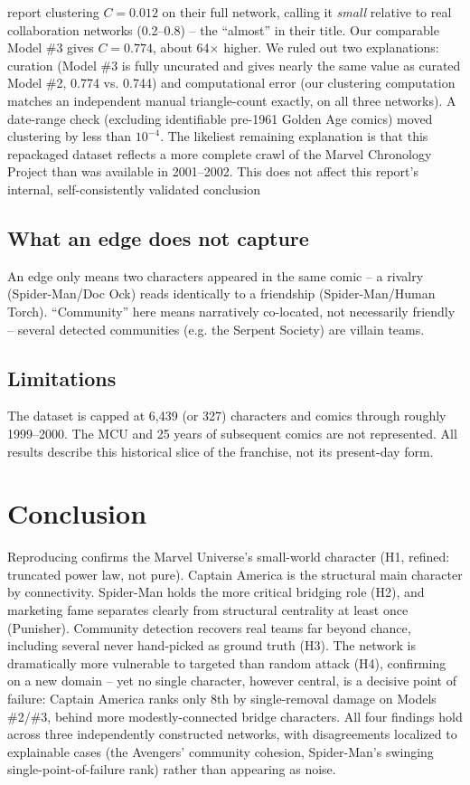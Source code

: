 \documentclass[11pt]{article}
\begin{document}
\citet{alberich2002marvel} report clustering $C = 0.012$ on their full network, calling it \emph{small} relative to real collaboration networks (0.2--0.8) -- the ``almost'' in their title. Our comparable Model \#3 gives $C = 0.774$, about 64$\times$ higher. We ruled out two explanations: curation (Model \#3 is fully uncurated and gives nearly the same value as curated Model \#2, 0.774 vs. 0.744) and computational error (our clustering computation matches an independent manual triangle-count exactly, on all three networks). A date-range check (excluding identifiable pre-1961 Golden Age comics) moved clustering by less than $10^{-4}$. The likeliest remaining explanation is that this repackaged dataset reflects a more complete crawl of the Marvel Chronology Project than was available in 2001--2002. This does not affect this report’s internal,
self-consistently validated conclusion

\subsection{What an edge does not capture}

An edge only means two characters appeared in the same comic -- a rivalry (Spider-Man/Doc Ock) reads identically to a friendship (Spider-Man/Human Torch). ``Community'' here means narratively co-located, not necessarily friendly -- several detected communities (e.g. the Serpent Society) are villain teams.

\subsection{Limitations}

The dataset is capped at 6{,}439 (or 327) characters and comics through roughly 1999--2000. The MCU and 25 years of subsequent comics are not represented. All results describe this historical slice of the franchise, not its present-day form.

\section{Conclusion}

Reproducing \citet{alberich2002marvel} confirms the Marvel Universe's small-world character (H1, refined: truncated power law, not pure). Captain America is the structural main character by connectivity. Spider-Man holds the more critical bridging role (H2), and marketing fame separates clearly from structural centrality at least once (Punisher). Community detection recovers real teams far beyond chance, including several never hand-picked as ground truth (H3). The network is dramatically more vulnerable to targeted than random attack (H4), confirming \citet{albert2000error} on a new domain -- yet no single character, however central, is a decisive point of failure: Captain America ranks only 8th by single-removal damage on Models \#2/\#3, behind more modestly-connected bridge characters. All four findings hold across three independently constructed networks, with disagreements localized to explainable cases (the Avengers' community cohesion, Spider-Man's swinging single-point-of-failure rank) rather than appearing as noise.
\end{document}
